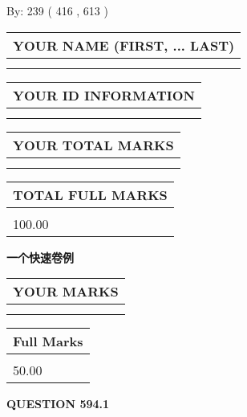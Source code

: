 \documentclass{ctexart}
\begin{document}
   
\hspace{1.0in} By: 
 239 ( 416 ,  613 )
   
   
   
   
\newpage 
\setcounter{page}{ 
   594001 } 
   
   
   
   
\noindent\begin{tabular}{|l|}
\hline
YOUR NAME (FIRST, ... LAST)  \\
\hline
 \\ 
 \\ 
\hline
\end{tabular}
\hspace{0.05in} \begin{tabular}{|l|}
\hline
 YOUR   ID   INFORMATION  \\
\hline
 \\ 
 \\ 
\hline
\end{tabular}
   
   
\vspace{0.2in}\noindent\begin{tabular}{|l|}
\hline
YOUR TOTAL MARKS  \\
\hline
 \\ 
 \\ 
\hline
\end{tabular}
\hspace{0.05in} \begin{tabular}{|l|}
\hline
TOTAL FULL MARKS  \\
\hline
 \\ 
100.00 \\
\hline
\end{tabular}
   
   
 \vspace{0.2in}
{\LARGE {\textbf{ 一个快速卷例}}}
   
   
  
\vspace{0.2in}
  
\noindent\begin{tabular}{|l|}
\hline
 YOUR MARKS  \\
\hline
 \\ 
 \\ 
\hline
\end{tabular}
\hspace{0.05in} \begin{tabular}{|l|}
\hline
 Full Marks  \\
\hline
 \\ 
50.00 \\
\hline
\end{tabular}
{\textbf{\Large{QUESTION
594.1 
}}}
  
\end{document}
